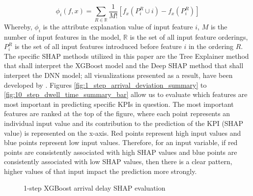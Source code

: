 \documentclass[]{interact}
\theoremstyle{plain}%
\theoremstyle{definition}
\theoremstyle{remark}
\begin{document}
\begin{equation}
    \phi_i(f,x) = \sum_{R\in\mathbb{R}}\frac{1}{M!}\left[f_x (P_i^R\cup i)-f_x(P_i^R)\right]
\end{equation}
Whereby, $\phi_i$ is the attribute explanation value of input feature $i$, $M$ is the number of input features in the model, $\mathbb{R}$ is the set of all input feature orderings, $P_i^R$ is the set of all input features introduced before feature $i$ in the ordering $R$. The specific SHAP methods utilized in this paper are the Tree Explainer method \citep{LUN19} that shall interpret the XGBoost model and the Deep SHAP method \citep{LUN17} that shall interpret the DNN model; all visualizations presented as a result, have been developed by \cite{LUN18}. Figures \ref{fig:1_step_arrival_deviation_summary} to \ref{fig:10_step_dwell_time_summary_bar} allow us to evaluate which features are most important in predicting specific KPIs in question. The most important features are ranked at the top of the figure, where each point represents an individual input value and its contribution to the prediction of the KPI (SHAP value) is represented on the x-axis. Red points represent high input values and blue points represent low input values. Therefore, for an input variable, if red points are consistently associated with high SHAP values and blue points are consistently associated with low SHAP values, then there is a clear pattern, higher values of that input impact the prediction more strongly.
\begin{figure}[H]
     \centering
      \caption{1-step XGBoost arrival delay SHAP evaluation}
\end{figure}
\end{document}
